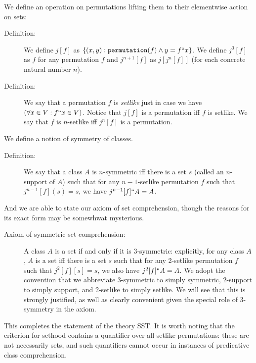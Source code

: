 \documentclass[12pt]{article}
\begin{document}
We define an operation on permutations lifting them to their elementwise action on sets:

\begin{description}

\item[Definition:]  We define $j[f]$ as $\{(x,y):{\tt permutation}(f) \wedge y = f``x\}$.  We define $j^0[f]$ as $f$ for any permutation $f$
and $j^{n+1}[f]$ as $j[j^n[f]]$ (for each concrete natural number $n$).

\item[Definition:]  We say that a permutation $f$ is {\em setlike\/} just in case we have $(\forall x \in V:f``x \in V)$.  Notice that $j[f]$ is a permutation iff $f$ is setlike.  We say that $f$ is $n$-setlike iff $j^n[f]$ is a permutation.

\end{description}

We define a notion of symmetry of classes.

\begin{description}

\item[Definition:]  We say that a class $A$ is $n$-symmetric iff there is a set $s$ (called an $n$-support of $A$) such
that for any $n-1$-setlike permutation $f$ such that $j^{n-1}[f](s)=s$, we have $j^{n-1}[f]``A= A$.

\end{description}

And we are able to state our axiom of set comprehension, though the reasons for its exact form may be somewhwat mysterious.

\begin{description}

\item[Axiom of symmetric set comprehension:]  A class $A$ is a set if and only if it is 3-symmetric:  explicitly, for any class $A$, $A$ is a set iff there is a set $s$ such that for any 2-setlike permutation $f$ such that $j^2[f][s]=s$, we also have $j^2[f]``A = A$.  We adopt the convention
that we abbreviate 3-symmetric to simply symmetric, 2-support to simply support,  and 2-setlike to simply setlike.  We will see that this is strongly justified, as well as clearly convenient given the special role of 3-symmetry in the axiom.

\end{description}

This completes the statement of the theory SST.  It is worth noting that the criterion for sethood contains a quantifier over all setlike permutations:  these are not necessarily sets, and such quantifiers cannot occur in instances of predicative class comprehension.
\end{document}
